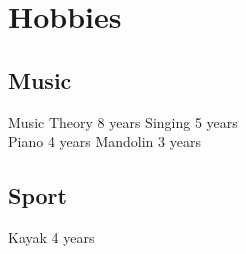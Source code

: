 \section{Hobbies}
\sectionsep

\subsection{Music}
Music Theory {\footnotesize 8 years} \textbullet{} Singing {\footnotesize 5 years} \\
Piano {\footnotesize 4 years} \textbullet{} Mandolin {\footnotesize 3 years}

\subsection{Sport}
Kayak {\footnotesize 4 years}



